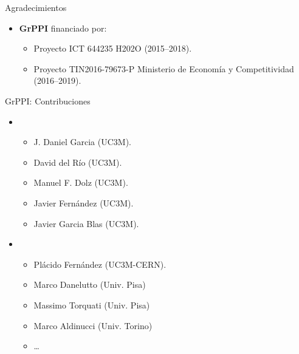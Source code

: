 \begin{frame}[t]{Agradecimientos}
\begin{itemize}
  \item \textbf{GrPPI} financiado por:
    \begin{itemize}
      \item Proyecto ICT 644235  
            H202O (2015--2018).
      \item Proyecto TIN2016-79673-P 
            Ministerio de Economía y Competitividad (2016--2019).
    \end{itemize}
\end{itemize}
\end{frame}

\begin{frame}[t]{GrPPI: Contribuciones}
\begin{itemize}
  \item {}
  \begin{itemize}
    \item J. Daniel Garcia (UC3M).
    \item David del Río (UC3M).
    \item Manuel F. Dolz (UC3M).
    \item Javier Fernández (UC3M).
    \item Javier Garcia Blas (UC3M).
  \end{itemize}
  \vfill
  \item {}
  \begin{itemize}
    \item Plácido Fernández (UC3M-CERN).
    \item Marco Danelutto (Univ. Pisa)
    \item Massimo Torquati (Univ. Pisa)
    \item Marco Aldinucci (Univ. Torino)
    \item \ldots
  \end{itemize}
\end{itemize}
\end{frame}
